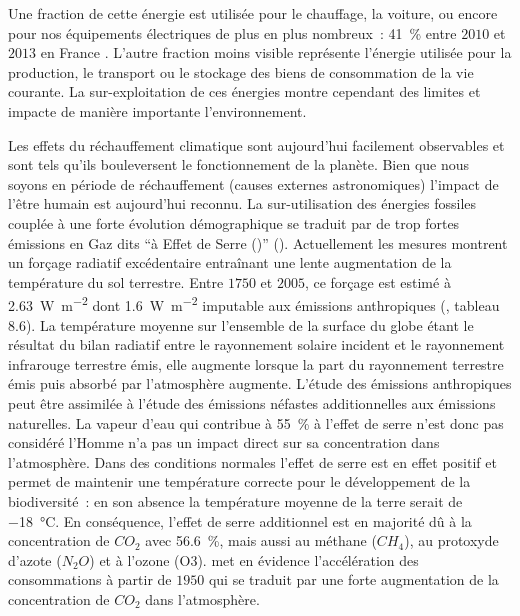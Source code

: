 Une fraction de cette énergie est utilisée pour le chauffage, la voiture, ou encore pour
nos équipements électriques de plus en plus nombreux~: \SI{+41}{\percent} entre $2010$ et
$2013$ en France \textcite{ADEME2015}. L’autre fraction moins visible représente
l’énergie utilisée pour la production, le transport ou le stockage des
biens de consommation de la vie courante. La sur-exploitation de ces énergies montre
cependant des limites et impacte de manière importante l’environnement.

Les effets du réchauffement climatique sont aujourd’hui facilement observables et sont
tels qu’ils bouleversent le fonctionnement de la planète. Bien que nous soyons en période
de réchauffement (causes externes astronomiques) l’impact de l’être humain est aujourd’hui
reconnu. La sur-utilisation des énergies fossiles couplée à une forte évolution
démographique se traduit par de trop fortes émissions en Gaz dits \enquote{à Effet de
Serre ()} (). Actuellement les mesures montrent un forçage
radiatif excédentaire entraînant une lente augmentation de la température du sol
terrestre. Entre $1750$ et $2005$, ce forçage est estimé à
\SI{2.63}{\watt\per\metre\squared} dont \SI{1.6}{\watt\per\metre\squared} imputable aux
émissions anthropiques (\cite{Myhre2013}, tableau $8.6$). La température moyenne sur
l’ensemble de la surface du globe étant le résultat du bilan radiatif entre le rayonnement
solaire incident et le rayonnement infrarouge terrestre émis, elle augmente lorsque la
part du rayonnement terrestre émis puis absorbé par l’atmosphère augmente.
L’étude des émissions anthropiques peut être assimilée à l’étude des émissions néfastes
additionnelles aux émissions naturelles. La vapeur d’eau qui contribue à \SI{55}{\percent}
à l’effet de serre n’est donc pas considéré l’Homme n’a pas un impact direct sur sa
concentration dans l’atmosphère. Dans des conditions normales l’effet de serre est en
effet positif et permet de maintenir une température correcte pour le développement de la
biodiversité~: en son absence la température moyenne de la terre serait de \SI{-18}{\celsius}.
En conséquence, l’effet de serre additionnel est en majorité dû à la concentration de
$CO_{2}$ avec \SI{56.6}{\percent}, mais aussi au méthane ($CH_{4}$), au protoxyde d’azote
($N_{2}O$) et à l’ozone (O3).  met en évidence l’accélération
des consommations à partir de $1950$ qui se traduit par une forte augmentation de la
concentration de $CO_{2}$ dans l’atmosphère.

